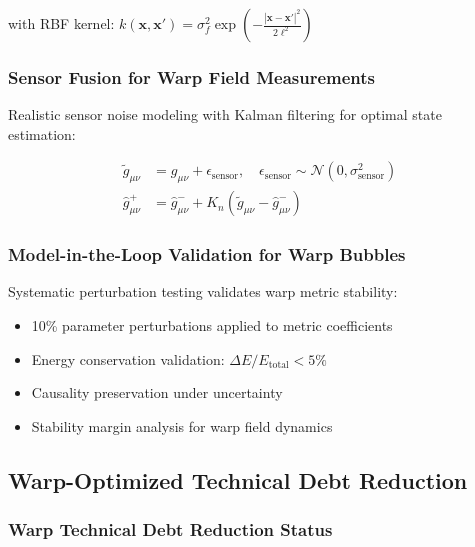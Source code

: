 \documentclass[11pt]{article}
\begin{document}
with RBF kernel: $k(\mathbf{x}, \mathbf{x}') = \sigma_f^2 \exp\left(-\frac{|\mathbf{x} - \mathbf{x}'|^2}{2\ell^2}\right)$

\subsubsection{Sensor Fusion for Warp Field Measurements}
Realistic sensor noise modeling with Kalman filtering for optimal state estimation:

\begin{align}
\tilde{g}_{\mu\nu} &= g_{\mu\nu} + \epsilon_{\text{sensor}}, \quad \epsilon_{\text{sensor}} \sim \mathcal{N}(0, \sigma_{\text{sensor}}^2) \\
\hat{g}_{\mu\nu}^+ &= \hat{g}_{\mu\nu}^- + K_n(\tilde{g}_{\mu\nu} - \hat{g}_{\mu\nu}^-)
\end{align}

\subsubsection{Model-in-the-Loop Validation for Warp Bubbles}
Systematic perturbation testing validates warp metric stability:

\begin{itemize}
\item 10\% parameter perturbations applied to metric coefficients
\item Energy conservation validation: $\Delta E / E_{\text{total}} < 5\%$
\item Causality preservation under uncertainty
\item Stability margin analysis for warp field dynamics
\end{itemize}

\subsection{Warp-Optimized Technical Debt Reduction}

\subsubsection{Warp Technical Debt Reduction Status}
\end{document}
